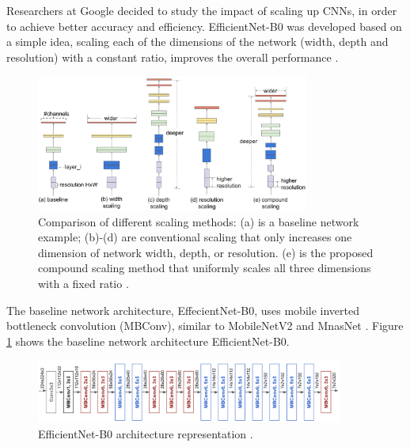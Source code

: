\par Researchers at Google decided to study the impact of scaling up CNNs, in order to achieve better accuracy and efficiency. EfficientNet-B0 was developed based on a simple idea, scaling each of the dimensions of the network (width, depth and resolution) with a constant ratio, improves the overall performance \cite{tan2019efficientnet}.

\begin{figure}[h]
    \centering
    \captionsetup{justification=centering}
    \includegraphics[width=0.8\textwidth]{Sections/2StateOfTheArt/2_images/efficientNet_scale.png}
    \caption[Comparison of different scaling methods.]{Comparison of different scaling methods:  (a) is a baseline network example; (b)-(d) are conventional scaling that only increases one dimension of network  width, depth, or resolution. (e) is the proposed compound scaling method that uniformly scales all three dimensions with a fixed ratio \cite{tan2019efficientnet}.
    } 

\end{figure}

\newpage

\par The baseline network architecture, EffecientNet-B0, uses mobile inverted bottleneck convolution (MBConv), similar to MobileNetV2 \cite{s2018mobilenetv2} and MnasNet \cite{tan2018mnasnet}. Figure \ref{fig:eff} shows the baseline network architecture EfficientNet-B0.

\begin{figure}[H]
    \centering
    \captionsetup{justification=centering}
    \includegraphics[width=0.9\textwidth]{Sections/2StateOfTheArt/2_images/efficientNet_Arch.png}
    \caption[EfficientNet-B0 architecture.]{EfficientNet-B0 architecture representation \cite{Tan}.} 
    \label{fig:eff}

\end{figure}



